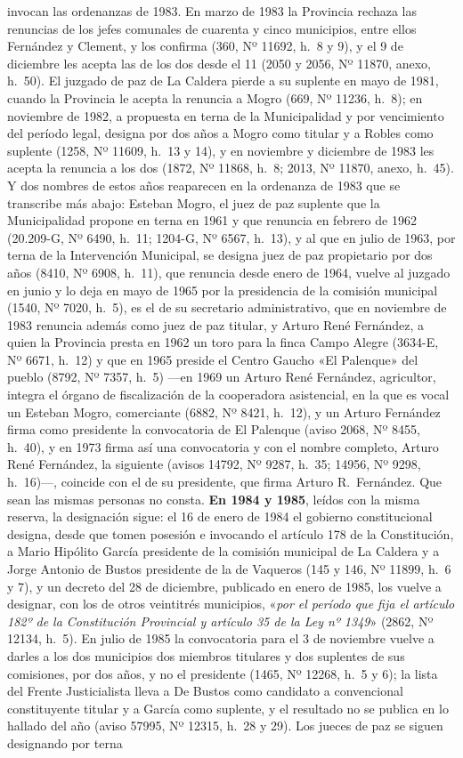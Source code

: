invocan las ordenanzas de 1983. En marzo de 1983 la Provincia rechaza las renuncias de los jefes comunales de cuarenta y cinco municipios, entre ellos Fernández y Clement, y los confirma (360, Nº 11692, h.\ 8 y 9), y el 9 de diciembre les acepta las de los dos desde el 11 (2050 y 2056, Nº 11870, anexo, h.\ 50). El juzgado de paz de La Caldera pierde a su suplente en mayo de 1981, cuando la Provincia le acepta la renuncia a Mogro (669, Nº 11236, h.\ 8); en noviembre de 1982, a propuesta en terna de la Municipalidad y por vencimiento del período legal, designa por dos años a Mogro como titular y a Robles como suplente (1258, Nº 11609, h.\ 13 y 14), y en noviembre y diciembre de 1983 les acepta la renuncia a los dos (1872, Nº 11868, h.\ 8; 2013, Nº 11870, anexo, h.\ 45). Y dos nombres de estos años reaparecen en la ordenanza de 1983 que se transcribe más abajo: Esteban Mogro, el juez de paz suplente que la Municipalidad propone en terna en 1961 y que renuncia en febrero de 1962 (20.209-G, Nº 6490, h.\ 11; 1204-G, Nº 6567, h.\ 13), y al que en julio de 1963, por terna de la Intervención Municipal, se designa juez de paz propietario por dos años (8410, Nº 6908, h.\ 11), que renuncia desde enero de 1964, vuelve al juzgado en junio y lo deja en mayo de 1965 por la presidencia de la comisión municipal (1540, Nº 7020, h.\ 5), es el de su secretario administrativo, que en noviembre de 1983 renuncia además como juez de paz titular, y Arturo René Fernández, a quien la Provincia presta en 1962 un toro para la finca Campo Alegre (3634-E, Nº 6671, h.\ 12) y que en 1965 preside el Centro Gaucho «El Palenque» del pueblo (8792, Nº 7357, h.\ 5) ---en 1969 un Arturo René Fernández, agricultor, integra el órgano de fiscalización de la cooperadora asistencial, en la que es vocal un Esteban Mogro, comerciante (6882, Nº 8421, h.\ 12), y un Arturo Fernández firma como presidente la convocatoria de El Palenque (aviso 2068, Nº 8455, h.\ 40), y en 1973 firma así una convocatoria y con el nombre completo, Arturo René Fernández, la siguiente (avisos 14792, Nº 9287, h.\ 35; 14956, Nº 9298, h.\ 16)---, coincide con el de su presidente, que firma Arturo R.\ Fernández. Que sean las mismas personas no consta. \textbf{En 1984 y 1985}, leídos con la misma reserva, la designación sigue: el 16 de enero de 1984 el gobierno constitucional designa, desde que tomen posesión e invocando el artículo 178 de la Constitución, a Mario Hipólito García presidente de la comisión municipal de La Caldera y a Jorge Antonio de Bustos presidente de la de Vaqueros (145 y 146, Nº 11899, h.\ 6 y 7), y un decreto del 28 de diciembre, publicado en enero de 1985, los vuelve a designar, con los de otros veintitrés municipios, «\textit{por el período que fija el artículo 182º de la Constitución Provincial y artículo 35 de la Ley nº 1349}» (2862, Nº 12134, h.\ 5). En julio de 1985 la convocatoria para el 3 de noviembre vuelve a darles a los dos municipios dos miembros titulares y dos suplentes de sus comisiones, por dos años, y no el presidente (1465, Nº 12268, h.\ 5 y 6); la lista del Frente Justicialista lleva a De Bustos como candidato a convencional constituyente titular y a García como suplente, y el resultado no se publica en lo hallado del año (aviso 57995, Nº 12315, h.\ 28 y 29). Los jueces de paz se siguen designando por terna 